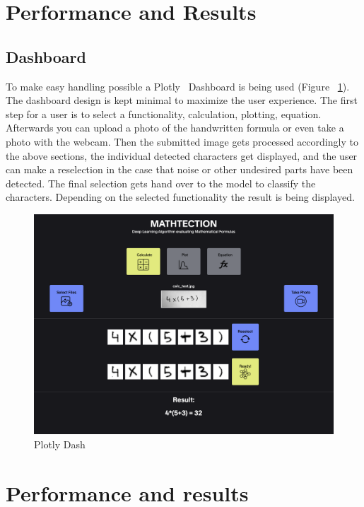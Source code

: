 \documentclass[@CLASSOPTIONS@]{tumarticle}
\begin{document}
\section{Performance and Results}
\label{sec:customization}

\subsection{Dashboard}
\label{subsec:dash}
To make easy handling possible a Plotly~\cite{plotly} Dashboard is being used (Figure ~\ref{Fig:Dash}).
The dashboard design is kept minimal to maximize the user experience.
The first step for a user is to select a functionality,
calculation, plotting, equation.
Afterwards you can upload a photo of the handwritten formula or even take a photo
with the webcam.
Then the submitted image gets processed accordingly to the above sections,
the individual detected characters get displayed, and the user can make a reselection
in the case that noise or other undesired parts have been detected.
The final selection gets hand over to the model to classify the characters.
Depending on the selected functionality the result is being displayed.

\begin{figure}
    \begin{minipage}{0.48\textwidth}
     \centering
     \includegraphics[width=.9\linewidth]{figures/dash}
     \caption{Plotly Dash}\label{Fig:Dash}
   \end{minipage}
\end{figure}

\section{Performance and results}
\end{document}
